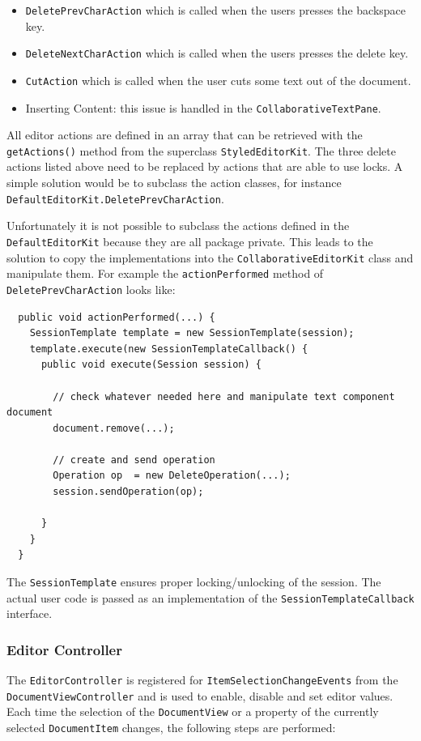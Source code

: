 \begin{itemize}
\item \texttt{DeletePrevCharAction} which is called when the users presses the backspace key.
\item \texttt{DeleteNextCharAction} which is called when the users presses the delete key.
\item \texttt{CutAction} which is called when the user cuts some text out of the document.
\item Inserting Content: this issue is handled in the \texttt{Collaborative\-Text\-Pane}.
\end{itemize}

All editor actions are defined in an array that can be retrieved with the \texttt{getActions()} method from the superclass \texttt{StyledEditorKit}. The three delete actions listed above need to be replaced by actions that are able to use locks. A simple solution would be to subclass the action classes,
for instance \texttt{Default\-Editor\-Kit.Delete\-Prev\-Char\-Action}.

Unfortunately it is not possible to subclass the actions defined in the \texttt{DefaultEditorKit} because they are all package private. This leads to the solution to copy the implementations into the \texttt{Collaborative\-Editor\-Kit} class and manipulate them. For example the \texttt{actionPerformed} method of \texttt{DeletePrevCharAction} looks like:

\begin{verbatim}
  public void actionPerformed(...) {
    SessionTemplate template = new SessionTemplate(session);
    template.execute(new SessionTemplateCallback() {
      public void execute(Session session) {

        // check whatever needed here and manipulate text component document
        document.remove(...);
        
        // create and send operation
        Operation op  = new DeleteOperation(...);
        session.sendOperation(op);

      }
    }
  }
\end{verbatim}

The \texttt{Session\-Template} ensures proper locking/unlocking of the session. The actual user code is passed as an implementation of the \texttt{Session\-Template\-Callback} interface.


\subsubsection{Editor Controller}
The \texttt{Editor\-Controller} is registered for \texttt{Item\-Selection\-Change\-Events} from the \texttt{Document\-View\-Controller} and is used to enable, disable and set editor values. Each time the selection of the \texttt{Document\-View} or a property of the currently selected \texttt{Document\-Item} changes, the following steps are performed:

